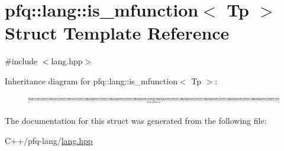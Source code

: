 \hypertarget{structpfq_1_1lang_1_1is__mfunction}{\section{pfq\+:\+:lang\+:\+:is\+\_\+mfunction$<$ Tp $>$ Struct Template Reference}
\label{structpfq_1_1lang_1_1is__mfunction}
}


{\ttfamily \#include $<$lang.\+hpp$>$}

Inheritance diagram for pfq\+:\+:lang\+:\+:is\+\_\+mfunction$<$ Tp $>$\+:\begin{figure}[H]
\begin{center}
\leavevmode
\includegraphics[height=0.352867cm]{structpfq_1_1lang_1_1is__mfunction}
\end{center}
\end{figure}


The documentation for this struct was generated from the following file\+:\begin{DoxyCompactItemize}
\item 
C++/pfq-\/lang/\hyperlink{lang_8hpp}{lang.\+hpp}\end{DoxyCompactItemize}
